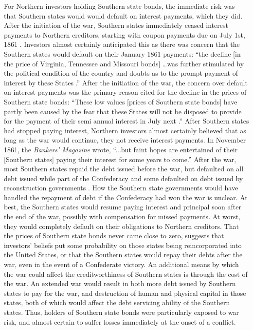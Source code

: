 For Northern investors holding Southern state bonds, the immediate risk was that Southern states would would default on interest payments, which they did.
After the initiation of the war, Southern states immediately ceased interest payments to Northern creditors, starting with coupon payments due on July 1st, 1861 \parencites[947]{BankersMagazine1860}[159]{BankersMagazine1862}.
Investors almost certainly anticipated this as there was concern that the Southern states would default on their January 1861 payments: ``the decline [in the price of Virginia, Tennessee and Missouri bonds] \dots was further stimulated by the political condition of the country and doubts as to the prompt payment of interest by these States \parencite[756]{BankersMagazine1860}.''
After the initiation of the war, the concern over default on interest payments was the primary reason cited for the decline in the prices of Southern state bonds: ``These low values [prices of Southern state bonds] have partly been caused by the fear that these States will not be disposed to provide for the payment of their semi annual interest in July next \parencite[947]{BankersMagazine1860}.''
After Southern states had stopped paying interest, Northern investors almost certainly believed that as long as the war would continue, they not receive interest payments.
In November 1861, the \textit{Bankers' Magazine} wrote, ``...but faint hopes are entertained of their [Southern states] paying their interest for some years to come.'' \parencite[559]{BankersMagazine1862}
After the war, most Southern states repaid the debt issued before the war, but defaulted on all debt issued while part of the Confederacy and some defaulted on debt issued by reconstruction governments \parencites{Randolph1931}{Ratchford1941}.
How the Southern state governments would have handled the repayment of debt if the Confederacy had won the war is unclear.
At best, the Southern states would resume paying interest and principal soon after the end of the war, possibly with compensation for missed payments.
At worst, they would completely default on their obligations to Northern creditors.
That the prices of Southern state bonds never came close to zero, suggests that investors' beliefs put some probability on those states being reincorporated into the United States, or that the Southern states would repay their debts after the war, even in the event of a Confederate victory.
An additional means by which the war could affect the creditworthiness of Southern states is through the cost of the war.
An extended war would result in both more debt issued by Southern states to pay for the war, and destruction of human and physical capital in those states, both of which would affect the debt servicing ability of the Southern states.
Thus, holders of Southern state bonds were particularly exposed to war risk, and almost certain to suffer losses immediately at the onset of a conflict.

